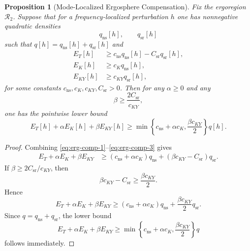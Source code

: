 \documentclass[12pt,a4paper]{article}
\newtheorem{proposition}[theorem]{Proposition}
\begin{document}
\begin{proposition}[Mode-Localized Ergosphere Compensation]\label{prop:ergosphere-compensation}
Fix the ergoregion $\mathcal{R}_2$. Suppose that for a frequency-localized perturbation $h$ one has nonnegative quadratic densities
\begin{equation}
q_{\mathrm{ns}}[h], \qquad q_{\mathrm{sr}}[h]
\end{equation}
such that $q[h] = q_{\mathrm{ns}}[h] + q_{\mathrm{sr}}[h]$ and
\begin{align}
E_T[h] &\ge c_{\mathrm{ns}} q_{\mathrm{ns}}[h] - C_{\mathrm{sr}} q_{\mathrm{sr}}[h], \label{eq:erg-comp-1}\\
E_K[h] &\ge c_K q_{\mathrm{ns}}[h], \label{eq:erg-comp-2}\\
E_{KY}[h] &\ge c_{KY} q_{\mathrm{sr}}[h], \label{eq:erg-comp-3}
\end{align}
for some constants $c_{\mathrm{ns}}, c_K, c_{KY}, C_{\mathrm{sr}} > 0$. Then for any $\alpha \ge 0$ and any
\begin{equation}
\beta \ge \frac{2C_{\mathrm{sr}}}{c_{KY}},
\end{equation}
one has the pointwise lower bound
\begin{equation}
E_T[h] + \alpha E_K[h] + \beta E_{KY}[h]
\ge
\min\left\{c_{\mathrm{ns}} + \alpha c_K,\frac{\beta c_{KY}}{2}\right\} q[h].
\end{equation}
\end{proposition}

\begin{proof}
Combining \eqref{eq:erg-comp-1}--\eqref{eq:erg-comp-3} gives
\begin{align}
E_T + \alpha E_K + \beta E_{KY}
&\ge (c_{\mathrm{ns}} + \alpha c_K) q_{\mathrm{ns}} + (\beta c_{KY} - C_{\mathrm{sr}}) q_{\mathrm{sr}}.
\end{align}
If $\beta \ge 2C_{\mathrm{sr}}/c_{KY}$, then
\begin{equation}
\beta c_{KY} - C_{\mathrm{sr}} \ge \frac{\beta c_{KY}}{2}.
\end{equation}
Hence
\begin{equation}
E_T + \alpha E_K + \beta E_{KY}
\ge
(c_{\mathrm{ns}} + \alpha c_K) q_{\mathrm{ns}} + \frac{\beta c_{KY}}{2} q_{\mathrm{sr}}.
\end{equation}
Since $q = q_{\mathrm{ns}} + q_{\mathrm{sr}}$, the lower bound
\begin{equation}
E_T + \alpha E_K + \beta E_{KY}
\ge
\min\left\{c_{\mathrm{ns}} + \alpha c_K,\frac{\beta c_{KY}}{2}\right\} q
\end{equation}
follows immediately.
\end{proof}
\end{document}
